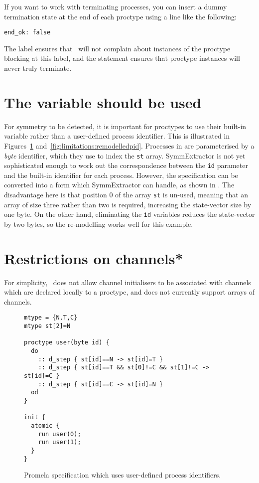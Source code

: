 If you want to work with terminating processes, you can insert a dummy termination state at the end of each proctype using
a line like the following:

\begin{lstlisting}
end_ok: false
\end{lstlisting}

The  label ensures that \spin\ will not complain about instances of the proctype blocking at this label,
and the  statement ensures that proctype instances will never truly terminate.

\section{The \protect{} variable should be used}

For symmetry to be detected, it is important for proctypes to use
their built-in  variable rather than a user-defined
process identifier.  This is illustrated in
Figures~\ref{fig:limitations:originalpid}
and~\ref{fig:limitations:remodelledpid}. Processes in
 are parameterised by a
{\it byte} identifier, which they use to index the \texttt{st}
array. SymmExtractor is not yet sophisticated enough to work out the
correspondence between the \texttt{id} parameter and the built-in
identifier for each process.  However, the specification can be
converted into a form which SymmExtractor can handle, as shown in
. The disadvantage
here is that position 0 of the array \texttt{st} is un-used, meaning
that an array of size three rather than two is required, increasing
the state-vector size by one byte. On the other hand, eliminating
the \texttt{id} variables reduces the state-vector by two bytes, so
the re-modelling works well for this example.

\section{Restrictions on channels*}
For simplicity, \topspin\ does not allow channel initialisers to be associated
with channels which are declared locally to a proctype, and does not currently
support arrays of channels.

\begin{figure}
\begin{scriptsize}
\begin{verbatim}
mtype = {N,T,C}
mtype st[2]=N

proctype user(byte id) {
  do
    :: d_step { st[id]==N -> st[id]=T }
    :: d_step { st[id]==T && st[0]!=C && st[1]!=C -> st[id]=C }
    :: d_step { st[id]==C -> st[id]=N }
  od
}

init {
  atomic {
    run user(0);
    run user(1);
  }
}
\end{verbatim}
\end{scriptsize}
\caption{Promela specification which uses user-defined process
identifiers.}\label{fig:limitations:originalpid}
\end{figure}

